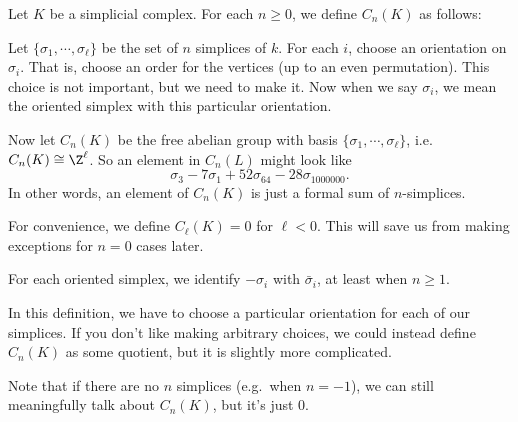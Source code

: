\documentclass[a4paper]{article}
\begin{document}
\begin{defi}
  Let $K$ be a simplicial complex. For each $n \geq 0$, we define $C_n(K)$ as follows:

  Let $\{\sigma_1, \cdots, \sigma_\ell\}$ be the set of $n$ simplices of $k$. For each $i$, choose an orientation on $\sigma_i$. That is, choose an order for the vertices (up to an even permutation). This choice is not important, but we need to make it. Now when we say $\sigma_i$, we mean the oriented simplex with this particular orientation.

  Now let $C_n(K)$ be the free abelian group with basis $\{\sigma_1, \cdots, \sigma_\ell\}$, i.e.\ $C_n(K) \cong \Z^\ell$. So an element in $C_n(L)$ might look like
  \[
    \sigma_3 - 7 \sigma_1 + 52 \sigma_{64} - 28 \sigma_{1000000}.
  \]
  In other words, an element of $C_n(K)$ is just a formal sum of $n$-simplices.

  For convenience, we define $C_{\ell}(K) = 0$ for $\ell < 0$. This will save us from making exceptions for $n = 0$ cases later.
\end{defi}
For each oriented simplex, we identify $-\sigma_i$ with $\bar{\sigma}_i$, at least when $n \geq 1$.

In this definition, we have to choose a particular orientation for each of our simplices. If you don't like making arbitrary choices, we could instead define $C_n(K)$ as some quotient, but it is slightly more complicated.

Note that if there are no $n$ simplices (e.g.\ when $n = -1$), we can still meaningfully talk about $C_n(K)$, but it's just $0$.
\end{document}
